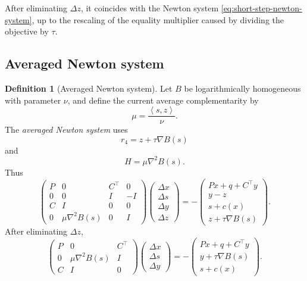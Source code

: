 \documentclass[a4paper,11pt]{book}
\theoremstyle{plain}
\theoremstyle{definition}
\newtheorem{definition}[theorem]{Definition}
\theoremstyle{remark}
\numberwithin{equation}{chapter}
\numberwithin{algorithm}{chapter}
\newcommand{\inner}[2]{\left\langle #1, #2 \right\rangle}
\begin{document}
	After eliminating \(\Delta z\), it coincides with the Newton system
	\eqref{eq:short-step-newton-system}, up to the rescaling of the equality
	multiplier caused by dividing the objective by \(\tau\).
	
	\subsection{Averaged Newton system}
	
	\begin{definition}[Averaged Newton system]
		Let \(B\) be logarithmically homogeneous with parameter \(\nu\), and define
		the current average complementarity by
		\begin{equation}
			\mu=\frac{\inner{s}{z}}{\nu}.
		\end{equation}
		The \emph{averaged Newton system} uses
		\[
		r_4=z+\tau\nabla B(s)
		\]
		and
		\[
		H=\mu\nabla^2B(s).
		\]
		Thus
		\begin{equation}
			\begin{pmatrix}
				P & 0 & C^\top & 0\\
				0 & 0 & I      & -I\\
				C & I & 0      & 0\\
				0 & \mu\nabla^2B(s) & 0 & I
			\end{pmatrix}
			\begin{pmatrix}
				\Delta x\\
				\Delta s\\
				\Delta y\\
				\Delta z
			\end{pmatrix}
			=
			-
			\begin{pmatrix}
				Px+q+C^\top y\\
				y-z\\
				s+c(x)\\
				z+\tau\nabla B(s)
			\end{pmatrix}.
		\end{equation}
		After eliminating \(\Delta z\),
		\begin{equation}
			\begin{pmatrix}
				P & 0 & C^\top\\
				0 & \mu\nabla^2B(s) & I\\
				C & I & 0
			\end{pmatrix}
			\begin{pmatrix}
				\Delta x\\
				\Delta s\\
				\Delta y
			\end{pmatrix}
			=
			-
			\begin{pmatrix}
				Px+q+C^\top y\\
				y+\tau\nabla B(s)\\
				s+c(x)
			\end{pmatrix}.
		\end{equation}
	\end{definition}
	
\end{document}

